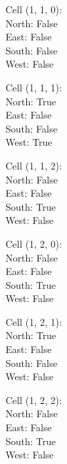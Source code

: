 \documentclass{article}
\begin{document}
\begin{multicols*}{3}
Cell (1, 1, 0):\\
\-\hspace{2cm}North: False\\
\-\hspace{2cm}East: False\\
\-\hspace{2cm}South: False\\
\-\hspace{2cm}West: False

Cell (1, 1, 1):\\
\-\hspace{2cm}North: True\\
\-\hspace{2cm}East: False\\
\-\hspace{2cm}South: False\\
\-\hspace{2cm}West: True

Cell (1, 1, 2):\\
\-\hspace{2cm}North: False\\
\-\hspace{2cm}East: False\\
\-\hspace{2cm}South: True\\
\-\hspace{2cm}West: False

Cell (1, 2, 0):\\
\-\hspace{2cm}North: False\\
\-\hspace{2cm}East: False\\
\-\hspace{2cm}South: True\\
\-\hspace{2cm}West: False

Cell (1, 2, 1):\\
\-\hspace{2cm}North: True\\
\-\hspace{2cm}East: False\\
\-\hspace{2cm}South: False\\
\-\hspace{2cm}West: False

Cell (1, 2, 2):\\
\-\hspace{2cm}North: False\\
\-\hspace{2cm}East: False\\
\-\hspace{2cm}South: True\\
\-\hspace{2cm}West: False


\end{multicols*}
\end{document}
